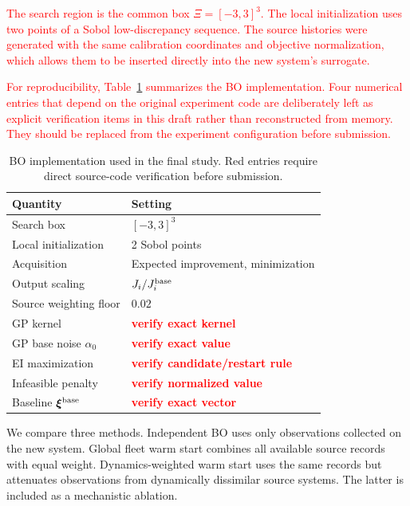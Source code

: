\documentclass[conference]{IEEEtran}
\newcommand{\rev}[1]{\textcolor{red}{#1}}
\begin{document}
\rev{The search region is the common box $\Xi=[-3,3]^3$. The local initialization uses two points of a Sobol low-discrepancy sequence. The source histories were generated with the same calibration coordinates and objective normalization, which allows them to be inserted directly into the new system's surrogate.}

\rev{For reproducibility, Table~\ref{tab:bo_details} summarizes the BO implementation. Four numerical entries that depend on the original experiment code are deliberately left as explicit verification items in this draft rather than reconstructed from memory. They should be replaced from the experiment configuration before submission.}

\begin{table}[t]
\centering
\caption{BO implementation used in the final study. Red entries require direct source-code verification before submission.}
\label{tab:bo_details}
\scriptsize
\begin{tabular}{@{}ll@{}}
\toprule
Quantity & Setting\\
\midrule
Search box & $[-3,3]^3$\\
Local initialization & 2 Sobol points\\
Acquisition & Expected improvement, minimization\\
Output scaling & $J_i/J_i^{\rm base}$\\
Source weighting floor & $0.02$\\
GP kernel & \rev{\textbf{verify exact kernel}}\\
GP base noise $\alpha_0$ & \rev{\textbf{verify exact value}}\\
EI maximization & \rev{\textbf{verify candidate/restart rule}}\\
Infeasible penalty & \rev{\textbf{verify normalized value}}\\
Baseline $\boldsymbol{\xi}^{\rm base}$ & \rev{\textbf{verify exact vector}}\\
\bottomrule
\end{tabular}
\end{table}

We compare three methods. Independent BO uses only observations collected on the new system. Global fleet warm start combines all available source records with equal weight. Dynamics-weighted warm start uses the same records but attenuates observations from dynamically dissimilar source systems. The latter is included as a mechanistic ablation.
\end{document}
